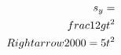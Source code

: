 \documentclass[preview]{standalone}
\begin{document}
\begin{align*}
\special{dvisvgm:raw <g id='unique000'>}s_y = \\frac{1}{2} g t^2 \\Rightarrow 2000 = 5 t^2\special{dvisvgm:raw </g>}
\end{align*}
\end{document}
